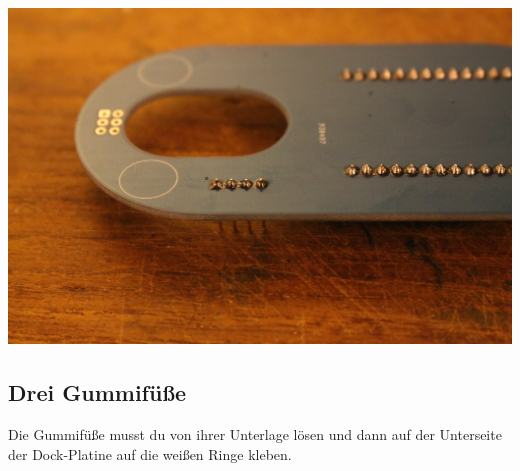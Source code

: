 \documentclass{article}
\begin{document}
\begin{minipage}[b]{0.5\textwidth}
	\includegraphics[width=\textwidth]{Bilder2019/IMG_6477.JPG}
\end{minipage}

\subsection{Drei Gummifüße}

Die Gummifüße musst du von ihrer Unterlage lösen und dann auf der Unterseite der Dock-Platine auf die weißen Ringe kleben.

\vspace{1cm}
\end{document}
